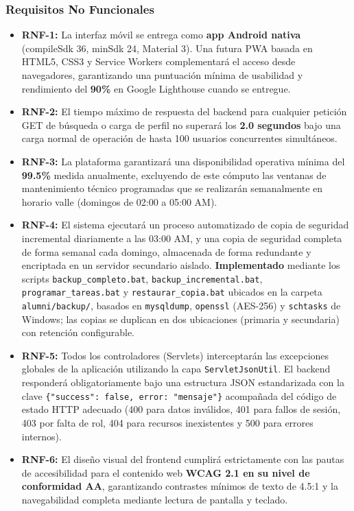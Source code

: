 \documentclass{report}
\begin{document}
\subsubsection{Requisitos No Funcionales}
\begin{itemize}
    \item \textbf{RNF-1:} La interfaz móvil se entrega como \textbf{app Android nativa} (compileSdk 36, minSdk 24, Material 3). Una futura PWA basada en HTML5, CSS3 y Service Workers complementará el acceso desde navegadores, garantizando una puntuación mínima de usabilidad y rendimiento del \textbf{90\%} en Google Lighthouse cuando se entregue.
    \item \textbf{RNF-2:} El tiempo máximo de respuesta del backend para cualquier petición GET de búsqueda o carga de perfil no superará los \textbf{2.0 segundos} bajo una carga normal de operación de hasta 100 usuarios concurrentes simultáneos.
    \item \textbf{RNF-3:} La plataforma garantizará una disponibilidad operativa mínima del \textbf{99.5\%} medida anualmente, excluyendo de este cómputo las ventanas de mantenimiento técnico programadas que se realizarán semanalmente en horario valle (domingos de 02:00 a 05:00 AM).
    \item \textbf{RNF-4:} El sistema ejecutará un proceso automatizado de copia de seguridad incremental diariamente a las 03:00 AM, y una copia de seguridad completa de forma semanal cada domingo, almacenada de forma redundante y encriptada en un servidor secundario aislado. \textbf{Implementado} mediante los scripts \texttt{backup\_completo.bat}, \texttt{backup\_incremental.bat}, \texttt{programar\_tareas.bat} y \texttt{restaurar\_copia.bat} ubicados en la carpeta \texttt{alumni/backup/}, basados en \texttt{mysqldump}, \texttt{openssl} (AES-256) y \texttt{schtasks} de Windows; las copias se duplican en dos ubicaciones (primaria y secundaria) con retención configurable.
    \item \textbf{RNF-5:} Todos los controladores (Servlets) interceptarán las excepciones globales de la aplicación utilizando la capa \texttt{ServletJsonUtil}. El backend responderá obligatoriamente bajo una estructura JSON estandarizada con la clave \texttt{\{"success": false, error: "mensaje"\}} acompañada del código de estado HTTP adecuado (400 para datos inválidos, 401 para fallos de sesión, 403 por falta de rol, 404 para recursos inexistentes y 500 para errores internos).
    \item \textbf{RNF-6:} El diseño visual del frontend cumplirá estrictamente con las pautas de accesibilidad para el contenido web \textbf{WCAG 2.1 en su nivel de conformidad AA}, garantizando contrastes mínimos de texto de 4.5:1 y la navegabilidad completa mediante lectura de pantalla y teclado.

\end{itemize}
\end{document}
